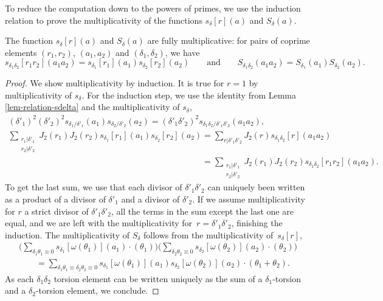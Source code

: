 To reduce the computation down to the powers of primes, we use the induction relation to prove the multiplicativity of the functions $s_\delta[r](a)$ and $S_\delta(a)$.

\begin{prop}\label{prop-multiplicativity-S}
The function $s_\delta[r](a)$ and $S_\delta(a)$ are fully multiplicative: for pairs of coprime elements $(r_1,r_2)$, $(a_1,a_2)$ and $(\delta_1,\delta_2)$, we have
\[ s_{\delta_1\delta_2}[r_1r_2](a_1a_2) = s_{\delta_1}[r_1](a_1)s_{\delta_2}[r_2](a_2)\qquad
\text{and}\qquad
S_{\delta_1\delta_2}(a_1a_2)=S_{\delta_1}(a_1)S_{\delta_2}(a_2). \]
\end{prop}

\begin{proof}
We show multiplicativity by induction. It is true for $r=1$ by multiplicativity of $s_\delta$. For the induction step, we use the identity from Lemma \ref{lem-relation-sdelta} and the multiplicativity of $s_\delta$,
\begin{gather*}
(\delta'_1)^2(\delta'_2)^2 s_{\delta_1/\delta'_1}(a_1)s_{\delta_2/\delta'_2}(a_2) = (\delta'_1\delta'_2)^2 s_{\delta_1\delta_2/\delta'_1\delta'_2}(a_1a_2), \\
\sum_{\substack{r_1|\delta'_1 \\ r_2|\delta'_2}} J_2(r_1)J_2(r_2)s_{\delta_1}[r_1](a_1)s_{\delta_2}[r_2](a_2) = \sum_{r|\delta'_1\delta'_2} J_2(r)s_{\delta_1\delta_2}[r](a_1a_2) \\
 \phantom{\sum_{\substack{r_1|\delta'_1 \\ r_2|\delta'_2}} J_2(r_1)J_2(r_2)s_{\delta_1}[r_1](a_1)s_{\delta_2}[r_2](a_2) }{}=\sum_{\substack{r_1|\delta'_1 \\ r_2|\delta'_2}} J_2(r_1)J_2(r_2)s_{\delta_1\delta_2}[r_1r_2](a_1a_2).
\end{gather*}
To get the last sum, we use that each divisor of $\delta'_1\delta'_2$ can uniquely been written as a product of a divisor of $\delta'_1$ and a divisor of $\delta'_2$. If we assume multiplicativity for $r$ a strict divisor of $\delta'_1\delta'_2$, all the terms in the sum except the last one are equal, and we are left with the multiplicativity for~${r=\delta'_1\delta'_2}$, finishing the induction. The multiplicativity of $S_\delta$ follows from the multiplicativity of~$s_\delta[r]$,
\begin{gather*}
\biggl(\sum_{\delta_1\theta_1\equiv 0}s_{\delta_1}[\omega(\theta_1)](a_1)\cdot(\theta_1) \biggr)\biggl(\sum_{\delta_2\theta_2\equiv 0}s_{\delta_2}[\omega(\theta_2)](a_2)\cdot(\theta_2) \biggr) \\
\qquad= \sum_{\delta_1\theta_1\equiv\delta_2\theta_2\equiv 0}s_{\delta_1}[\omega(\theta_1)](a_1)s_{\delta_2}[\omega(\theta_2)](a_2)\cdot(\theta_1+\theta_2).
\end{gather*}
As each $\delta_1\delta_2$ torsion element can be written uniquely as the sum of a $\delta_1$-torsion and a $\delta_2$-torsion element, we conclude.
\end{proof}

